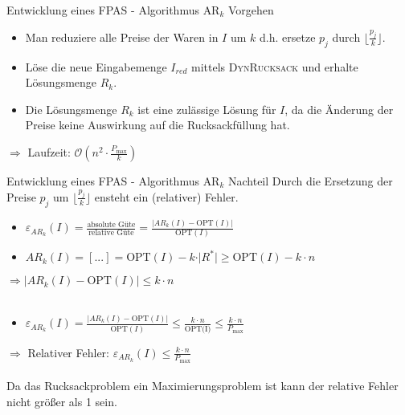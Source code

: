 \begin{frame}{Entwicklung eines FPAS - Algorithmus $\text{AR}_k$ Vorgehen}	
	\begin{itemize}
		\item 
		Man reduziere alle Preise der Waren in $I$ um $k$ d.h. ersetze $p_j$ durch $\displaystyle \lfloor \frac {p_j}{k} \rfloor $.
		\item
		Löse die neue Eingabemenge $I_{red}$ mittels \textsc{DynRucksack} und erhalte Lösungsmenge $R_k$.
		\item
		Die Lösungsmenge $R_k$ ist eine zulässige Lösung für $I$, da die Änderung der Preise keine Auswirkung auf die Rucksackfüllung hat.
		
	\end{itemize}
	$\Rightarrow$ Laufzeit: $\displaystyle \mathcal O(n^2 \cdot \frac{P_{\max}}{k})$
\end{frame}

\begin{frame}{Entwicklung eines FPAS - Algorithmus $\text{AR}_k$ Nachteil}
	Durch die Ersetzung der Preise $p_j$ um $\displaystyle \lfloor \frac {p_j}{k} \rfloor $ ensteht ein (relativer) Fehler.
	\begin{itemize}
		
		\item
		$\displaystyle \varepsilon_{AR_k}(I) = \frac {\text{absolute Güte}} {\text{relative Güte}} = \frac{\vert AR_k(I) - \text{OPT}(I) \vert}{\text{OPT}(I)}$ 
		\item
		$AR_k(I) = [...] = \text{OPT}(I) - k \cdot \vert R^* \vert \ge \text{OPT}(I) - k \cdot n$
	\end{itemize}	
	
	$\Rightarrow \vert AR_k(I) - \text{OPT}(I) \vert \le k \cdot n$\\~\\
	\begin{itemize}
		\item
		$\displaystyle \varepsilon_{AR_k}(I) = \frac{\vert AR_k(I) - \text{OPT}(I) \vert}{\text{OPT}(I)} \le \frac{k \cdot  n}{\text{OPT(I)}} \le \frac{k \cdot n}{P_{\max}}$
	\end{itemize}
	
	$\Rightarrow$ Relativer Fehler: $\displaystyle \varepsilon_{AR_k}(I) \le \frac{k \cdot n}{P_{\max}}$\\~\\
	
	Da das Rucksackproblem ein Maximierungsproblem ist kann der relative Fehler nicht größer als 1 sein.
\end{frame}

